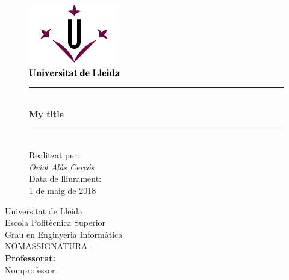 \documentclass{article}
\author{Oriol Alàs Cercós}
\date{29 d'Abril del 2019}
\begin{document}
\begin{titlepage}
\begin{figure}[htb]
\begin{center}
	\includegraphics[width=4cm]{UDL.png}
   	\\
   	\medskip
   	\begin{center}
   		\noindent\rule{16.5cm}{0.4pt}
   		\medskip 
   		\\
      	\Huge\textbf{My title}
      	\noindent\rule{16.5cm}{0.4pt}
      	\\
      	\bigskip
      	\normalsize{Realitzat per:}
      	\\
      	\large\textit{Oriol Alàs Cercós}
      	\\
      	\setlength{\parskip}{1em}
      	\normalsize{Data de lliurament:}
      	\\
      	\large{1 de maig de 2018}
   	\end{center}
\end{center}
\end{figure}
\begin{flushright}
Universitat de Lleida
\\
Escola Politècnica Superior
\\
Grau en Enginyeria Informàtica
\\
NOMASSIGNATURA
\\
\medskip
\textbf{Professorat:}
\\
Nomprofessor
\end{flushright}
\thispagestyle{empty} 
\end{titlepage}
\tableofcontents
\thispagestyle{empty} 
\newpage
\end{document}
